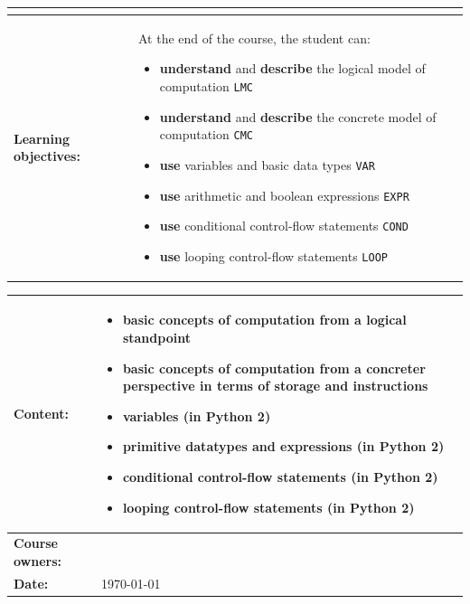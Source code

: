 \begin{tabularx}{\textwidth}{|>{\columncolor{lichtGrijs}} p{}|X|}
\begin{center}
	\end{center}\\
	\hline
	\textbf{Learning objectives:} &
		At the end of the course, the student can:
			\begin{itemize}
				\item \textbf{understand} and \textbf{describe} the logical model of computation \texttt{LMC}
				\item \textbf{understand} and \textbf{describe} the concrete model of computation \texttt{CMC}
				\item \textbf{use} variables and basic data types \texttt{VAR}
				\item \textbf{use} arithmetic and boolean expressions \texttt{EXPR}
				\item \textbf{use} conditional control-flow statements \texttt{COND}
				\item \textbf{use} looping control-flow statements \texttt{LOOP}
			\end{itemize} \\
		
	\hline
\end{tabularx}
\newpage

\begin{tabularx}{\textwidth}{|>{\columncolor{lichtGrijs}} p{}|X|}
	\hline
	\textbf{Content:}&
	\begin{itemize}
		\item basic concepts of computation from a logical standpoint
		\item basic concepts of computation from a concreter perspective in terms of storage and instructions
		\item variables (in Python 2)
		\item primitive datatypes and expressions (in Python 2)
		\item conditional control-flow statements (in Python 2)
		\item looping control-flow statements (in Python 2)
	\end{itemize} \\
	\hline
	\textbf{Course owners:} & \author\\
	\hline
	\textbf{Date:} & \today \\
	\hline
\end{tabularx}
\newpage
